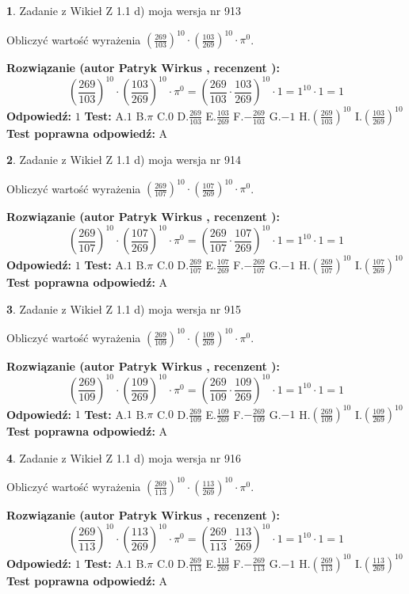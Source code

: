 \documentclass[12pt, a4paper]{article}
\theoremstyle{definition} %
\newtheorem{zad}{}
\newcommand{\zadStart}[1]{\begin{zad}#1\newline}
\newcommand{\zadStop}{\end{zad}}
\newcommand{\rozwStart}[2]{\noindent \textbf{Rozwiązanie (autor #1 , recenzent #2): }\newline}
\newcommand{\rozwStop}{\newline}
\newcommand{\odpStart}{\noindent \textbf{Odpowiedź:}\newline}
\newcommand{\odpStop}{\newline}
\newcommand{\testStart}{\noindent \textbf{Test:}\newline}
\newcommand{\testStop}{\newline}
\newcommand{\kluczStart}{\noindent \textbf{Test poprawna odpowiedź:}\newline}
\newcommand{\kluczStop}{\newline}
\begin{document}
\zadStart{Zadanie z Wikieł Z 1.1 d) moja wersja nr 913}

Obliczyć wartość wyrażenia $(\frac{269}{103})^{10} \cdot (\frac{103}{269})^{10} \cdot \pi^{0}$.
\zadStop
\rozwStart{Patryk Wirkus}{}
$$(\frac{269}{103})^{10} \cdot (\frac{103}{269})^{10} \cdot \pi^{0} = (\frac{269}{103} \cdot \frac{103}{269})^{10} \cdot 1 = 1^{10} \cdot 1 = 1$$
\rozwStop
\odpStart
$1$
\odpStop
\testStart
A.$1$ B.$\pi$ C.$0$ D.$\frac{269}{103}$ E.$\frac{103}{269}$
F.$-\frac{269}{103}$ G.$-1$
H.$(\frac{269}{103})^{10}$
I.$(\frac{103}{269})^{10}$
\testStop
\kluczStart
A
\kluczStop



\zadStart{Zadanie z Wikieł Z 1.1 d) moja wersja nr 914}

Obliczyć wartość wyrażenia $(\frac{269}{107})^{10} \cdot (\frac{107}{269})^{10} \cdot \pi^{0}$.
\zadStop
\rozwStart{Patryk Wirkus}{}
$$(\frac{269}{107})^{10} \cdot (\frac{107}{269})^{10} \cdot \pi^{0} = (\frac{269}{107} \cdot \frac{107}{269})^{10} \cdot 1 = 1^{10} \cdot 1 = 1$$
\rozwStop
\odpStart
$1$
\odpStop
\testStart
A.$1$ B.$\pi$ C.$0$ D.$\frac{269}{107}$ E.$\frac{107}{269}$
F.$-\frac{269}{107}$ G.$-1$
H.$(\frac{269}{107})^{10}$
I.$(\frac{107}{269})^{10}$
\testStop
\kluczStart
A
\kluczStop



\zadStart{Zadanie z Wikieł Z 1.1 d) moja wersja nr 915}

Obliczyć wartość wyrażenia $(\frac{269}{109})^{10} \cdot (\frac{109}{269})^{10} \cdot \pi^{0}$.
\zadStop
\rozwStart{Patryk Wirkus}{}
$$(\frac{269}{109})^{10} \cdot (\frac{109}{269})^{10} \cdot \pi^{0} = (\frac{269}{109} \cdot \frac{109}{269})^{10} \cdot 1 = 1^{10} \cdot 1 = 1$$
\rozwStop
\odpStart
$1$
\odpStop
\testStart
A.$1$ B.$\pi$ C.$0$ D.$\frac{269}{109}$ E.$\frac{109}{269}$
F.$-\frac{269}{109}$ G.$-1$
H.$(\frac{269}{109})^{10}$
I.$(\frac{109}{269})^{10}$
\testStop
\kluczStart
A
\kluczStop



\zadStart{Zadanie z Wikieł Z 1.1 d) moja wersja nr 916}

Obliczyć wartość wyrażenia $(\frac{269}{113})^{10} \cdot (\frac{113}{269})^{10} \cdot \pi^{0}$.
\zadStop
\rozwStart{Patryk Wirkus}{}
$$(\frac{269}{113})^{10} \cdot (\frac{113}{269})^{10} \cdot \pi^{0} = (\frac{269}{113} \cdot \frac{113}{269})^{10} \cdot 1 = 1^{10} \cdot 1 = 1$$
\rozwStop
\odpStart
$1$
\odpStop
\testStart
A.$1$ B.$\pi$ C.$0$ D.$\frac{269}{113}$ E.$\frac{113}{269}$
F.$-\frac{269}{113}$ G.$-1$
H.$(\frac{269}{113})^{10}$
I.$(\frac{113}{269})^{10}$
\testStop
\kluczStart
A
\kluczStop
\end{document}
